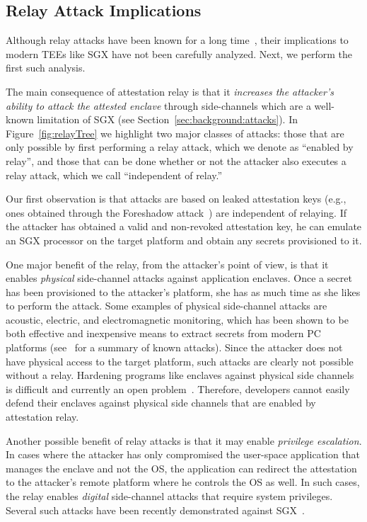             
\subsection{Relay Attack Implications}
\label{sec:problemStatement:implication}

Although relay attacks have been known for a long time~\cite{parno2008bootstrapping}, their implications to modern TEEs like SGX have not been carefully analyzed. Next, we perform the first such analysis.

The main consequence of attestation relay is that it \emph{increases the attacker's ability to attack the attested enclave} through side-channels which are a well-known limitation of SGX (see Section~\ref{sec:background:attacks}). In Figure~\ref{fig:relayTree} we highlight two major classes of attacks: those that are only possible by first performing a relay attack, which we denote as ``enabled by relay'', and those that can be done whether or not the attacker also executes a relay attack, which we call ``independent of relay.''


 Our first observation is that attacks are based on leaked attestation keys (e.g., ones obtained through the Foreshadow attack~\cite{foreshadow-usenix18}) are independent of relaying. If the attacker has obtained a valid and non-revoked attestation key, he can emulate an SGX processor on the target platform and obtain any secrets provisioned to it.


 One major benefit of the relay, from the attacker's point of view, is that it enables \emph{physical} side-channel attacks against application enclaves. Once a secret has been provisioned to the attacker's platform, she has as much time as she likes to perform the attack. Some examples of physical side-channel attacks are acoustic, electric, and electromagnetic monitoring, which has been shown to be both effective and inexpensive means to extract secrets from modern PC platforms (see~\cite{genkin2016physical} for a summary of known attacks). Since the attacker does not have physical access to the target platform, such attacks are clearly not possible without a relay. Hardening programs like enclaves against physical side channels is difficult and currently an open problem~\cite{genkin2016physical}. Therefore, developers cannot easily defend their enclaves against physical side channels that are enabled by attestation relay.


Another possible benefit of relay attacks is that it may enable \emph{privilege escalation}. In cases where the attacker has only compromised the user-space application that manages the enclave and not the OS, the application can redirect the attestation to the attacker's remote platform where he controls the OS as well. In such cases, the relay enables \emph{digital} side-channel attacks that require system privileges. Several such attacks have been recently demonstrated against SGX~\cite{moghimi2017cachezoom, sgxcache, gotzfried2017cache}.


